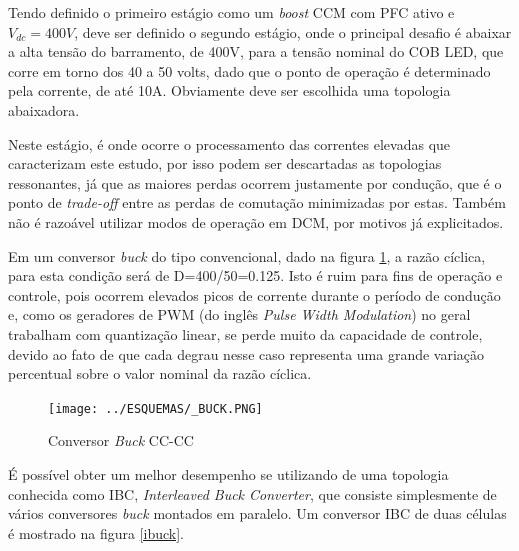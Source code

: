 \documentclass[
        12pt,
        openany, %
        oneside, %
        a4paper,			
        english,			
        brazil
        ]{abntbibufjf}
\begin{document}


Tendo definido o primeiro estágio como um \textit{boost} CCM com PFC ativo e $V_{dc}=400V$, deve ser definido o segundo estágio, onde o principal desafio é abaixar a alta tensão do barramento, de 400V, para a tensão nominal do COB LED, que corre em torno dos 40 a 50 volts, dado que o ponto de operação é determinado pela corrente, de até 10A. Obviamente deve ser escolhida uma topologia abaixadora.

Neste estágio, é onde ocorre o processamento das correntes elevadas que caracterizam este estudo, por isso podem ser descartadas as topologias ressonantes, já que as maiores perdas ocorrem justamente por condução, que é o ponto de \textit{trade-off} entre as perdas de comutação minimizadas por estas. Também não é razoável utilizar modos de operação em DCM, por motivos já explicitados.

Em um conversor \textit{buck} do tipo convencional, dado na figura \ref{buck}, a razão cíclica, para esta condição será de D=400/50=0.125. Isto é ruim para fins de operação e controle, pois ocorrem elevados picos de corrente durante o período de condução e, como os geradores de PWM (do inglês \textit{Pulse Width Modulation}) no geral trabalham com quantização linear, se perde muito da capacidade de controle, devido ao fato de que cada degrau nesse caso representa uma grande variação percentual sobre o valor nominal da razão cíclica.

\begin{figure}[!h]
	\centering
	\caption{Conversor \textit{Buck} CC-CC}
	\texttt{[image: ../ESQUEMAS/\_BUCK.PNG]}\\
	\label{buck}
\end{figure}

É possível obter um melhor desempenho se utilizando de uma topologia conhecida como IBC, \textit{Interleaved Buck Converter}, que consiste simplesmente de vários conversores \textit{buck} montados em paralelo. Um conversor IBC de duas células é mostrado na figura \ref{ibuck}.
\end{document}
